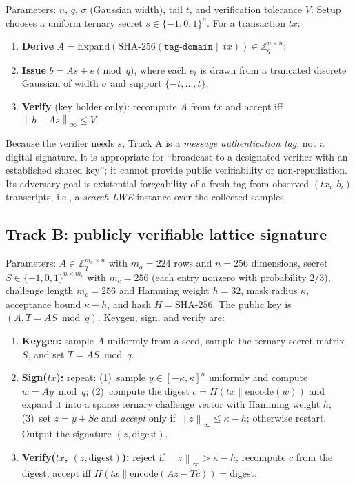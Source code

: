 \documentclass[11pt]{article}
\newcommand{\Zq}{\mathbb{Z}_q}
\newcommand{\norminf}[1]{\left\lVert #1 \right\rVert_\infty}
\begin{document}
Parameters: $n$, $q$, $\sigma$ (Gaussian width), tail $t$, and verification
tolerance $V$.  Setup chooses a uniform ternary secret $s \in \{-1,0,1\}^n$.
For a transaction $tx$:
\begin{enumerate}
\item \textbf{Derive} $A = \text{Expand}(\mathrm{SHA\text{-}256}(\texttt{tag-domain} \| tx)) \in \Zq^{n\times n}$;
\item \textbf{Issue} $b = A s + e \pmod q$, where each $e_i$ is drawn from a
  truncated discrete Gaussian of width $\sigma$ and support $\{-t,\dots,t\}$;
\item \textbf{Verify} (key holder only): recompute $A$ from $tx$ and accept iff
  $\norminf{b - A s} \le V$.
\end{enumerate}
Because the verifier needs $s$, Track A is a \emph{message authentication tag},
not a digital signature.  It is appropriate for ``broadcast to a designated
verifier with an established shared key''; it cannot provide public
verifiability or non-repudiation.  Its adversary goal is existential
forgeability of a fresh tag from observed $(tx_i, b_i)$ transcripts, i.e., a
\emph{search-LWE} instance over the collected samples.

\subsection{Track B: publicly verifiable lattice signature}\label{sec:trackb}

Parameters: $A \in \Zq^{m_a \times n}$ with $m_a=224$ rows and $n=256$
dimensions, secret $S\in \{-1,0,1\}^{n\times m_c}$ with $m_c=256$ (each entry
nonzero with probability $2/3$), challenge length $m_c=256$ and Hamming weight
$h=32$, mask radius $\kappa$, acceptance bound $\kappa - h$, and hash
$H = \mathrm{SHA\text{-}256}$.  The public key is $(A, T = A S \bmod q)$.
Keygen, sign, and verify are:

\begin{enumerate}
\item \textbf{Keygen:} sample $A$ uniformly from a seed, sample the ternary
  secret matrix $S$, and set $T = A S \bmod q$.
\item \textbf{Sign($tx$):} repeat: (1)~sample $y \in [-\kappa,\kappa]^n$
  uniformly and compute $w = A y \bmod q$; (2)~compute the digest
  $c = H(tx \| \text{encode}(w))$ and expand it into a sparse ternary challenge
  vector with Hamming weight $h$; (3)~set $z = y + S c$ and \emph{accept} only
  if $\norminf{z} \le \kappa - h$; otherwise restart.  Output the signature
  $(z, \text{digest})$.
\item \textbf{Verify($tx$, $(z,\text{digest})$):} reject if
  $\norminf{z} > \kappa-h$; recompute $c$ from the digest; accept iff
  $H(tx \| \text{encode}(A z - T c)) = \text{digest}$.
\end{enumerate}
\end{document}
